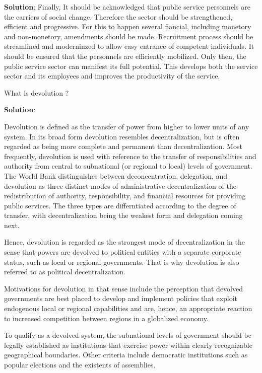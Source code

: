 \documentclass[
  openany]{book}
\newcommand{\question}{\item}
\newenvironment{solution}{ {\bfseries Solution}:}{}
\begin{document}
\begin{questions}
\begin{solution}
Finally, It should be acknowledged that public service personnels are the carriers of social change. Therefore the sector should be strengthened, efficient and progressive. For this to happen several fiancial, including monetory and non-monetory, amendments should be made. Recruitment process should be streamlined and moderninzed to allow easy entrance of competent individuals. It should be ensured that the personnels are efficiently mobilized. Only then, the public service sector can manifest its full potential. This develops both the service sector and its employees and improves the productivity of the service.

\end{solution}

\question What is devolution ?

\begin{solution}

Devolution is defined as the transfer of power from higher to lower units of any system. In its broad form devolution resembles decentralization, but is often regarded as being more complete and permanent than decentralization. Most frequently, devolution is used with reference to the transfer of responsibilities and authority from central to subnational (or regional to local) levels of government. The World Bank distinguishes between deconcentration, delegation, and devolution as three distinct modes of administrative decentralization of the redistribution of authority, responsibility, and financial resources for providing public services. The three types are differntiated according to the degree of transfer, with decentralization being the weakest form and delegation coming next. 

Hence, devolution is regarded as the strongest mode of decentralization in the sense that powers are devolved to political entities with a separate corporate status, such as local or regional governments. That is why devolution is also referred to as political decentralization. 

Motivations for devolution in that sense include the perception that devolved governments are best placed to develop and implement policies that exploit endogenous local or regional capabilities and are, hence, an appropriate reaction to increased competition between regions in a globalized economy.

To qualify as a devolved system, the subnational levels of government should be legally established as institutions that exercise power within clearly recognizable geographical boundaries. Other criteria include democratic institutions such as popular elections and the existents of assemblies.


\end{solution}
\end{questions}
\end{document}

